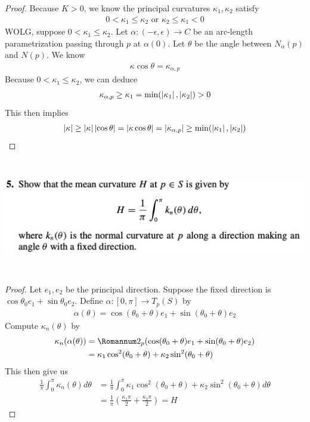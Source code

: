 \documentclass{report}
\begin{document}
\begin{proof}
Because $K>0$, we know the principal curvatures $\kappa_1, \kappa_2$ satisfy 
\begin{align*}
0<\kappa_1 \leq \kappa_2 \text{ or }\kappa_2\leq \kappa_1 < 0
\end{align*}
WOLG, suppose $0<\kappa_1\leq \kappa_2$. Let $\alpha:(-\epsilon ,\epsilon )\rightarrow C$ be an arc-length parametrization passing through $p$ at  $\alpha (0)$. Let $\theta$ be the angle between $N_\alpha (p)$ and $N(p)$. We know 
\begin{align*}
\kappa \cos \theta = \kappa_{\alpha ,p}
\end{align*}
Because $0<\kappa_1 \leq \kappa_2$, we can deduce 
\begin{align*}
\kappa_{\alpha ,p}\geq \kappa_1 =\min (\left|\kappa_1\right|,\left|\kappa_2\right|)>0
\end{align*}
This then implies 
\begin{align*}
\left|\kappa\right|\geq \left|\kappa \right|\left|\cos \theta\right|=\left|\kappa \cos \theta\right|= \left|\kappa_{\alpha ,p}\right|\geq \min (\left|\kappa_1\right|,\left|\kappa_2\right|)
\end{align*}
\end{proof}
\begin{question}{}{}
\includegraphics[height=5cm,width=18cm]{hw5q3}
\end{question}
\begin{proof}
Let $e_1,e_2$ be the principal direction. Suppose the fixed direction is $\cos \theta_0 e_1+ \sin \theta_0 e_2$.  Define $\alpha :[0,\pi]\rightarrow T_p(S)$ by 
\begin{align*}
\alpha (\theta)= \cos (\theta_0+\theta) e_1+ \sin (\theta_0+\theta)e_2
\end{align*}
Compute $\kappa_n (\theta)$ by  
\begin{align*}
\kappa_n(\alpha (\theta))&=\Sec_p(\cos (\theta_0+\theta) e_1+ \sin (\theta_0+\theta)e_2)\\
&=\kappa_1 \cos^2(\theta_0+\theta)+\kappa_2 \sin^2 (\theta_0+\theta)
\end{align*}
This then give us 
\begin{align*}
\frac{1}{\pi}\int_0^{\pi}\kappa_n (\theta)d\theta&= \frac{1}{\pi}\int_0^{\pi} \kappa_1 \cos^2 (\theta_0+\theta)+ \kappa_2 \sin^2 (\theta_0+\theta)d\theta\\
&=\frac{1}{\pi}(\frac{\kappa_1 \pi}{2}+ \frac{\kappa_2 \pi}{2})=H
\end{align*}
\end{proof}
\end{document}
